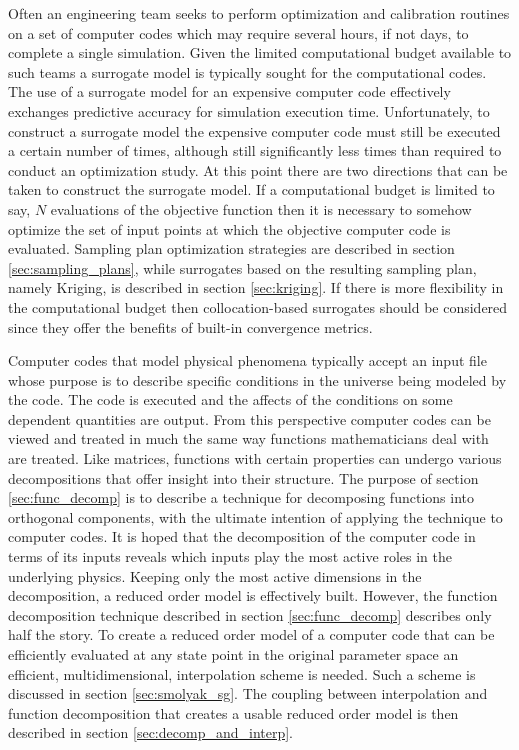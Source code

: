 
Often an engineering team seeks to perform optimization and calibration routines on a set of computer codes which may require several hours, if not days, to complete a single simulation. Given the limited computational budget available to such teams a surrogate model is typically sought for the computational codes. The use of a surrogate model for an expensive computer code effectively exchanges predictive accuracy for simulation execution time. Unfortunately, to construct a surrogate model the expensive computer code must still be executed a certain number of times, although still significantly less times than required to conduct an optimization study. At this point there are two directions that can be taken to construct the surrogate model. If a computational budget is limited to say, $N$ evaluations of the objective function then it is necessary to somehow optimize the set of input points at which the objective computer code is evaluated. Sampling plan optimization strategies are described in section \ref{sec:sampling_plans}, while surrogates based on the resulting sampling plan, namely Kriging, is described in section \ref{sec:kriging}. If there is more flexibility in the computational budget then collocation-based surrogates should be considered since they offer the benefits of built-in convergence metrics.        

Computer codes that model physical phenomena typically accept an input file whose purpose is to describe specific conditions in the universe being modeled by the code. The code is executed and the affects of the conditions on some dependent quantities are output. From this perspective computer codes can be viewed and treated in much the same way functions mathematicians deal with are treated. Like matrices, functions with certain properties can undergo various decompositions that offer insight into their structure. The purpose of section \ref{sec:func_decomp} is to describe a technique for decomposing functions into orthogonal components, with the ultimate intention of applying the technique to computer codes. It is hoped that the decomposition of the computer code in terms of its inputs reveals which inputs play the most active roles in the underlying physics. Keeping only the most active dimensions in the decomposition, a reduced order model is effectively built. However, the function decomposition technique described in section \ref{sec:func_decomp} describes only half the story. To create a reduced order model of a computer code that can be efficiently evaluated at any state point in the original parameter space an efficient, multidimensional, interpolation scheme is needed. Such a scheme is discussed in section \ref{sec:smolyak_sg}. The coupling between interpolation and function decomposition that creates a usable reduced order model is then described in section \ref{sec:decomp_and_interp}.    






